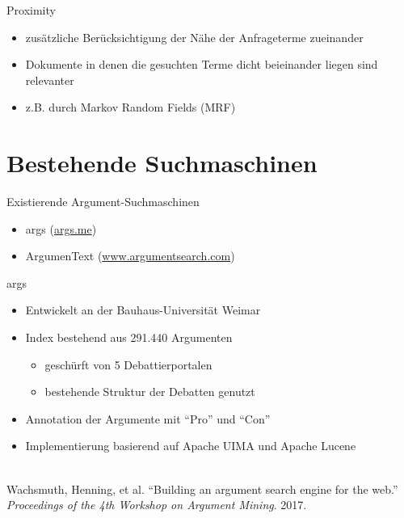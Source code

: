 \documentclass{beamer}
\begin{document}
	\begin{frame}{Proximity}
		\begin{itemize}
			\item zusätzliche Berücksichtigung der Nähe der Anfrageterme zueinander
			\item Dokumente in denen die gesuchten Terme dicht beieinander liegen sind relevanter
			\item z.B. durch Markov Random Fields (MRF)
		\end{itemize}
	\end{frame}

	\section{Bestehende Suchmaschinen}
	\begin{frame}{Existierende Argument-Suchmaschinen}
		\begin{itemize}
			\item args (\url{args.me})
			\item ArgumenText (\url{www.argumentsearch.com})
		\end{itemize}
	\end{frame}
	\begin{frame}{args}
		\begin{itemize}
			\item Entwickelt an der Bauhaus-Universität Weimar
			\item Index bestehend aus 291.440 Argumenten
			\begin{itemize}
				\item geschürft von 5 Debattierportalen
				\item bestehende Struktur der Debatten genutzt
			\end{itemize}
			\item Annotation der Argumente mit ``Pro'' und ``Con''
			\item Implementierung basierend auf Apache UIMA und Apache Lucene
		\end{itemize}
		~\\
		\tiny Wachsmuth, Henning, et al. ``Building an argument search engine for the web.''
		\textit{Proceedings of the 4th Workshop on Argument Mining}. 2017.
	\end{frame}
\end{document}
